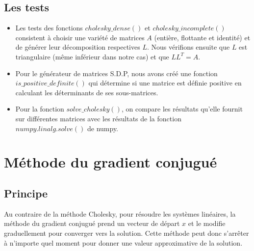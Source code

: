 \documentclass{article}
\begin{document}
\subsection{Les tests}
\begin{itemize}
    \item Les tests des fonctions $cholesky\_dense()$ et $cholesky\_incomplete()$ consistent \`a choisir une vari\'et\'e de matrices $A$ (enti\`ere, flottante et identit\'e) et de g\'en\'erer leur d\'ecomposition respectives $L$. Nous v\'erifions ensuite que $L$ est triangulaire (m\^eme inf\'erieur dans notre cas) et que $LL^T=A$.
    \item Pour le g\'en\'erateur de matrices S.D.P, nous avons cr\'e\'e une fonction $is\_positive\_definite()$ qui d\'etermine si une matrice est d\'efinie positive en calculant les d\'eterminants de ses sous-matrices.
    \item Pour la fonction $solve\_cholesky()$, on compare les r\'esultats qu'elle fournit sur diff\'erentes matrices avec les r\'esultats de la fonction $numpy.linalg.solve()$ de numpy.
\end{itemize}
\section{M\'ethode du gradient conjugu\'e}
\subsection{Principe}
Au contraire de la m\'ethode Cholesky, pour r\'esoudre les syst\`emes lin\'eaires, la m\'ethode du gradient conjugu\'e prend un vecteur de d\'epart $x$ et le modifie graduellement pour converger vers la solution. Cette m\'ethode peut donc s'arr\^eter \`a n'importe quel moment pour donner une valeur approximative de la solution.
\end{document}
